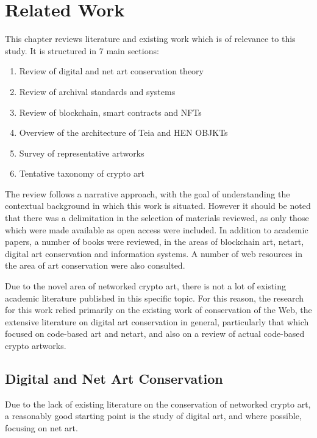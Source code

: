 \chapter{Related Work}
\label{chap:related_work}

This chapter reviews literature and existing work which is of relevance to this study. It is structured in 7 main sections:

\begin{enumerate}
    \item Review of digital and net art conservation theory
    \item Review of archival standards and systems
    \item Review of blockchain, smart contracts and NFTs
    \item Overview of the architecture of Teia and HEN OBJKTs
    \item Survey of representative artworks
    \item Tentative taxonomy of crypto art
\end{enumerate}

\vspace{0.5cm}

The review follows a narrative approach, with the goal of understanding the contextual background in which this work is situated. However it should be noted that there was a delimitation in the selection of materials reviewed, as only those which were made available as open access were included. In addition to academic papers, a number of books were reviewed, in the areas of blockchain art, netart, digital art conservation and information systems. A number of web resources in the area of art conservation were also consulted. 

Due to the novel area of networked crypto art, there is not a lot of existing academic literature published in this specific topic. For this reason, the research for this work relied primarily on the existing work of conservation of the Web, the extensive literature on digital art conservation in general, particularly that which focused on code-based art and netart, and also on a review of actual code-based crypto artworks.

\section{Digital and Net Art Conservation}

Due to the lack of existing literature on the conservation of networked crypto art, a reasonably good starting point is the study of digital art, and where possible, focusing on net art.

